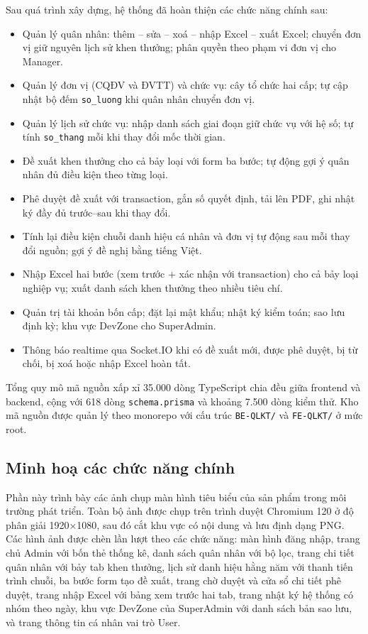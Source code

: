 \documentclass[../DoAn.tex]{subfiles}
\begin{document}
Sau quá trình xây dựng, hệ thống đã hoàn thiện các chức năng chính sau:

\begin{itemize}
    \item Quản lý quân nhân: thêm -- sửa -- xoá -- nhập Excel -- xuất Excel; chuyển đơn vị giữ nguyên lịch sử khen thưởng; phân quyền theo phạm vi đơn vị cho Manager.
    \item Quản lý đơn vị (CQĐV và ĐVTT) và chức vụ: cây tổ chức hai cấp; tự cập nhật bộ đếm \texttt{so\_luong} khi quân nhân chuyển đơn vị.
    \item Quản lý lịch sử chức vụ: nhập danh sách giai đoạn giữ chức vụ với hệ số; tự tính \texttt{so\_thang} mỗi khi thay đổi mốc thời gian.
    \item Đề xuất khen thưởng cho cả bảy loại với form ba bước; tự động gợi ý quân nhân đủ điều kiện theo từng loại.
    \item Phê duyệt đề xuất với transaction, gắn số quyết định, tải lên PDF, ghi nhật ký đầy đủ trước--sau khi thay đổi.
    \item Tính lại điều kiện chuỗi danh hiệu cá nhân và đơn vị tự động sau mỗi thay đổi nguồn; gợi ý đề nghị bằng tiếng Việt.
    \item Nhập Excel hai bước (xem trước + xác nhận với transaction) cho cả bảy loại nghiệp vụ; xuất danh sách khen thưởng theo nhiều tiêu chí.
    \item Quản trị tài khoản bốn cấp; đặt lại mật khẩu; nhật ký kiểm toán; sao lưu định kỳ; khu vực DevZone cho SuperAdmin.
    \item Thông báo realtime qua Socket.IO khi có đề xuất mới, được phê duyệt, bị từ chối, bị xoá hoặc nhập Excel hoàn tất.
\end{itemize}

Tổng quy mô mã nguồn xấp xỉ 35.000 dòng TypeScript chia đều giữa frontend và backend, cộng với 618 dòng \texttt{schema.prisma} và khoảng 7.500 dòng kiểm thử. Kho mã nguồn được quản lý theo monorepo với cấu trúc \texttt{BE-QLKT/} và \texttt{FE-QLKT/} ở mức root.

\subsection{Minh hoạ các chức năng chính}
\label{subsection:4.3.3}

Phần này trình bày các ảnh chụp màn hình tiêu biểu của sản phẩm trong môi trường phát triển. Toàn bộ ảnh được chụp trên trình duyệt Chromium 120 ở độ phân giải 1920×1080, sau đó cắt khu vực có nội dung và lưu định dạng PNG. Các hình ảnh được chèn lần lượt theo các chức năng: màn hình đăng nhập, trang chủ Admin với bốn thẻ thống kê, danh sách quân nhân với bộ lọc, trang chi tiết quân nhân với bảy tab khen thưởng, lịch sử danh hiệu hằng năm với thanh tiến trình chuỗi, ba bước form tạo đề xuất, trang chờ duyệt và cửa sổ chi tiết phê duyệt, trang nhập Excel với bảng xem trước hai tab, trang nhật ký hệ thống có nhóm theo ngày, khu vực DevZone của SuperAdmin với danh sách bản sao lưu, và trang thông tin cá nhân vai trò User.
\end{document}
